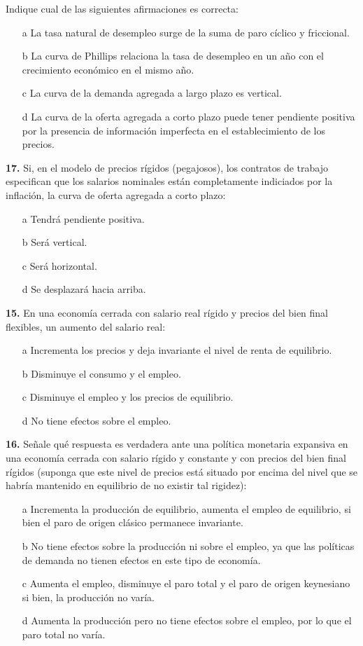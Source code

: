 \documentclass{nuevotema}
\begin{document}
Indique cual de las siguientes afirmaciones es correcta:

\begin{itemize}
	\item[a] La tasa natural de desempleo surge de la suma de paro cíclico y friccional.
	\item[b] La curva de Phillips relaciona la tasa de desempleo en un año con el crecimiento económico en el mismo año.
	\item[c] La curva de la demanda agregada a largo plazo es vertical.
	\item[d] La curva de la oferta agregada a corto plazo puede tener pendiente positiva por la presencia de información imperfecta en el establecimiento de los precios.
\end{itemize}


\textbf{17.} Si, en el modelo de precios rígidos (pegajosos), los contratos de trabajo especifican que los salarios nominales están completamente indiciados por la inflación, la curva de oferta agregada a corto plazo:
\begin{itemize}
	\item[a] Tendrá pendiente positiva.
	\item[b] Será vertical.
	\item[c] Será horizontal.
	\item[d] Se desplazará hacia arriba.
\end{itemize}

\textbf{15.} En una economía cerrada con salario real rígido y precios del bien final flexibles, un aumento del salario real:
\begin{itemize}
	\item[a] Incrementa los precios y deja invariante el nivel de renta de equilibrio.
	\item[b] Disminuye el consumo y el empleo.
	\item[c] Disminuye el empleo y los precios de equilibrio.
	\item[d] No tiene efectos sobre el empleo.
\end{itemize}

\textbf{16.} Señale qué respuesta es verdadera ante una política monetaria expansiva en una economía cerrada con salario rígido y constante y con precios del bien final rígidos (suponga que este nivel de precios está situado por encima del nivel que se habría mantenido en equilibrio de no existir tal rigidez):
\begin{itemize}
	\item[a] Incrementa la producción de equilibrio, aumenta el empleo de equilibrio, si bien el paro de origen clásico permanece invariante.
	\item[b] No tiene efectos sobre la producción ni sobre el empleo, ya que las políticas de demanda no tienen efectos en este tipo de economía.
	\item[c] Aumenta el empleo, disminuye el paro total y el paro de origen keynesiano si bien, la producción no varía.
	\item[d] Aumenta la producción pero no tiene efectos sobre el empleo, por lo que el paro total no varía.
\end{itemize}
\end{document}
